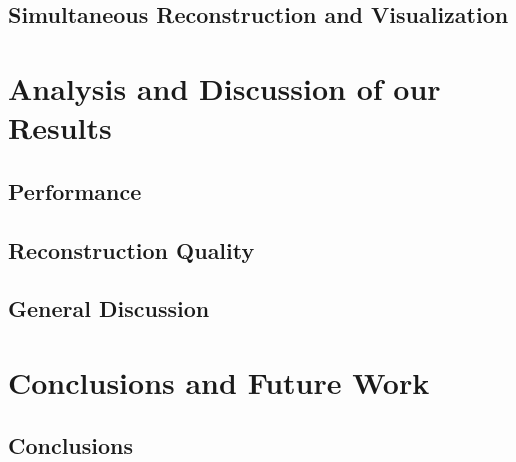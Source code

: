 \documentclass[12pt, twoside, a4paper]{book}
\begin{document}
	\section{Simultaneous Reconstruction and Visualization}
		\label{section:reconstruction_visualization}

		
	
\chapter{Analysis and Discussion of our Results}
	\label{chapter:results_discussion}
	
	
		
	\section{Performance}
	
		
		
	\section{Reconstruction Quality}
	
		
		
	\section{General Discussion}
		
		
		
		

\chapter{Conclusions and Future Work}
	\label{chapter:conclusion_future_work}
	
		

	\section{Conclusions}
		
		
\end{document}
